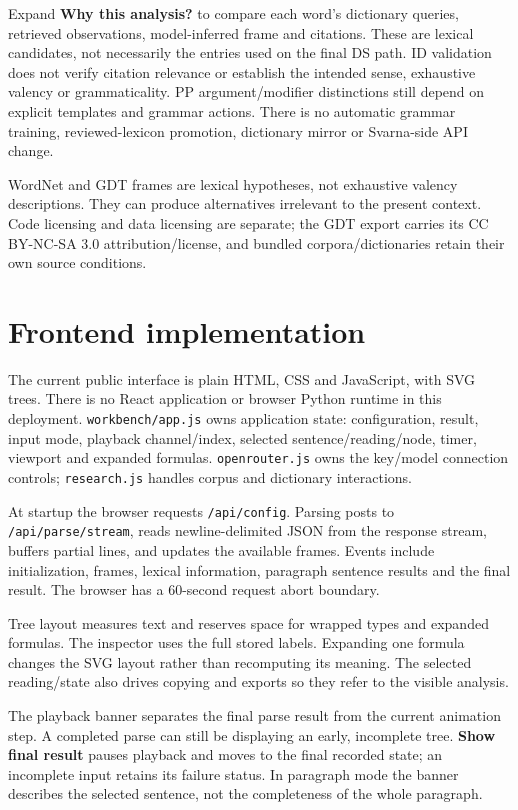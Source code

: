 \documentclass[11pt,a4paper]{article}
\begin{document}
Expand \textbf{Why this analysis?} to compare each word's dictionary
queries, retrieved observations, model-inferred frame and citations.
These are lexical candidates, not necessarily the entries used on the
final DS path. ID validation does not verify citation relevance or
establish the intended sense, exhaustive valency or grammaticality. PP
argument/modifier distinctions still depend on explicit templates and
grammar actions. There is no automatic grammar training,
reviewed-lexicon promotion, dictionary mirror or Svarna-side API change.

WordNet and GDT frames are lexical hypotheses, not exhaustive valency
descriptions. They can produce alternatives irrelevant to the present
context. Code licensing and data licensing are separate; the GDT export
carries its CC BY-NC-SA 3.0 attribution/license, and bundled
corpora/dictionaries retain their own source conditions.

\section{Frontend implementation}\label{frontend-implementation}

The current public interface is plain HTML, CSS and JavaScript, with SVG
trees. There is no React application or browser Python runtime in this
deployment. \nolinkurl{workbench/app.js} owns application state:
configuration, result, input mode, playback channel/index, selected
sentence/reading/node, timer, viewport and expanded formulas.
\texttt{openrouter.js} owns the key/model connection controls;
\texttt{research.js} handles corpus and dictionary interactions.

At startup the browser requests \nolinkurl{/api/config}. Parsing posts
to \nolinkurl{/api/parse/stream}, reads newline-delimited JSON from the
response stream, buffers partial lines, and updates the available
frames. Events include initialization, frames, lexical information,
paragraph sentence results and the final result. The browser has a
60-second request abort boundary.

Tree layout measures text and reserves space for wrapped types and
expanded formulas. The inspector uses the full stored labels. Expanding
one formula changes the SVG layout rather than recomputing its meaning.
The selected reading/state also drives copying and exports so they refer
to the visible analysis.

The playback banner separates the final parse result from the current
animation step. A completed parse can still be displaying an early,
incomplete tree. \textbf{Show final result} pauses playback and moves to
the final recorded state; an incomplete input retains its failure
status. In paragraph mode the banner describes the selected sentence,
not the completeness of the whole paragraph.
\end{document}
